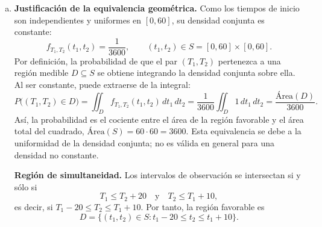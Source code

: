 \documentclass[a4paper]{article}
\begin{document}
\begin{enumerate}[a.]


Para comprobar el sentido de estos límites, distinguimos quién inicia primero. Si $T_2\ge T_1$, el observador 1 debe seguir observando cuando comienza el 2, por lo que $T_2-T_1\le 10$. Si $T_2\le T_1$, el observador 2 debe seguir observando cuando comienza el 1, por lo que $T_1-T_2\le 20$. Así, el límite superior es $t_2=t_1+10$ y el inferior es $t_2=t_1-20$; las duraciones no se intercambian.

Además, cuando hay traslape, ambos están observando en el instante $\max\{T_1,T_2\}$, que pertenece a $[0,60]$. Por ello, permitir que una sesión termine después del minuto $60$ no introduce coincidencias que ocurran exclusivamente fuera de la ventana.


Gráficamente, en el plano $(t_1,t_2)$, la región de simultaneidad es la intersección del cuadrado $[0,60]\times[0,60]$ con la franja delimitada por las rectas $t_2=t_1-20$ y $t_2=t_1+10$:

Los vértices de esta región, recorridos en orden, son
$$
(0,0),\ (20,0),\ (60,40),\ (60,60),\ (50,60),\ (0,10).
$$



\item \textbf{Justificación de la equivalencia geométrica.}
Como los tiempos de inicio son independientes y uniformes en $[0,60]$, su densidad conjunta es constante:
$$
f_{T_1,T_2}(t_1,t_2)=\frac{1}{3600},
\qquad (t_1,t_2)\in S=[0,60]\times[0,60].
$$
Por definición, la probabilidad de que el par $(T_1,T_2)$ pertenezca a una región medible $D\subseteq S$ se obtiene integrando la densidad conjunta sobre ella. Al ser constante, puede extraerse de la integral:
$$
P\bigl((T_1,T_2)\in D\bigr)
=\iint_D f_{T_1,T_2}(t_1,t_2)\,dt_1\,dt_2
=\frac{1}{3600}\iint_D 1\,dt_1\,dt_2
=\frac{\text{Área}(D)}{3600}.
$$
Así, la probabilidad es el cociente entre el área de la región favorable y el área total del cuadrado, $\text{Área}(S)=60\cdot60=3600$. Esta equivalencia se debe a la uniformidad de la densidad conjunta; no es válida en general para una densidad no constante.

\textbf{Región de simultaneidad.}
Los intervalos de observación se intersectan si y sólo si
$$
T_1\le T_2+20
\quad\text{y}\quad
T_2\le T_1+10,
$$
es decir, si $T_1-20\le T_2\le T_1+10$. Por tanto, la región favorable es
$$
D=\bigl\{(t_1,t_2)\in S: t_1-20\le t_2\le t_1+10\bigr\}.
$$


\end{enumerate}
\end{document}
